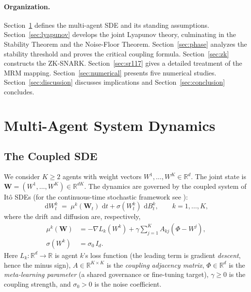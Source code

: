 \documentclass[12pt]{article}
\theoremstyle{plain}
\theoremstyle{definition}
\newcommand{\R}{\mathbb{R}}
\newcommand{\W}{\mathbf{W}}
\newcommand{\dif}{\,\mathrm{d}}
\newcommand{\loss}{L}
\begin{document}
\paragraph{Organization.}
Section~\ref{sec:model} defines the multi-agent SDE and its standing
assumptions.  Section~\ref{sec:lyapunov} develops the joint Lyapunov
theory, culminating in the Stability Theorem and the Noise-Floor Theorem.
Section~\ref{sec:phase} analyzes the stability threshold and proves the
critical coupling formula.  Section~\ref{sec:zk} constructs the
ZK-SNARK.  Section~\ref{sec:sr117} gives a detailed treatment of the
MRM mapping.  Section~\ref{sec:numerical} presents five numerical
studies.  Section~\ref{sec:discussion} discusses implications and
Section~\ref{sec:conclusion} concludes.

\section{Multi-Agent System Dynamics}
\label{sec:model}

\subsection{The Coupled SDE}

We consider $K \geq 2$ agents with weight vectors
$W^1, \ldots, W^K \in \R^d$.  The joint state is
$\W = (W^1, \ldots, W^K) \in \R^{dK}$.  The dynamics are governed by
the coupled system of It\^{o} SDEs (for the continuous-time stochastic
framework see \cite{pham2009continuous}):
\begin{equation}
  \dif W^k_t \;=\; \mu^k(\W_t)\,\dif t + \sigma(W^k_t)\,\dif B^k_t,
  \qquad k = 1, \ldots, K,
  \label{eq:sde}
\end{equation}
where the drift and diffusion are, respectively,
\begin{align}
  \mu^k(\W) &= -\nabla \loss_k(W^k) + \gamma \sum_{j=1}^K A_{kj}
               (\Phi - W^j),
  \label{eq:drift} \\
  \sigma(W^k) &= \sigma_0 \, I_d.
  \label{eq:diffusion}
\end{align}
Here $\loss_k : \R^d \to \R$ is agent $k$'s loss function (the leading term
is gradient \emph{descent}, hence the minus sign),
$A \in \R^{K \times K}$ is the \emph{coupling adjacency matrix},
$\Phi \in \R^d$ is the \emph{meta-learning parameter} (a shared
governance or fine-tuning target), $\gamma \geq 0$ is the coupling
strength, and $\sigma_0 > 0$ is the noise coefficient.
\end{document}
